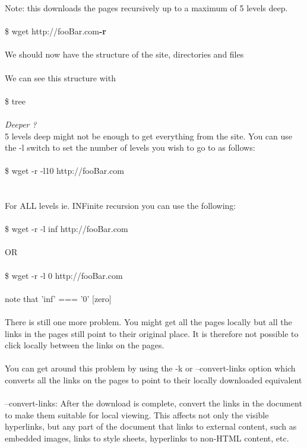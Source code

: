 \documentclass[10pt,a4paper]{article}
\begin{document}
{Note: this downloads the pages recursively up to a maximum of 5 levels deep.\\
\\
\$ wget http://fooBar.com}{\large \textbf{-r}}{\large \\
\\
We should now have the structure of the site, directories and files\\
\\
	We can see this structure with\\
\\
	\$ tree\\
\\
\textit{Deeper ?}}{\large \\
5 levels deep might not be enough to get everything from the site. You can use the -l switch to set the number of levels you wish to go to as follows:\\
\\
\$ wget -r -l10 http://fooBar.com}{\large \\
\\
\\
For ALL levels ie. INFinite recursion you can use the following:\\
\\
\$ wget -r -l inf http://fooBar.com}{\large \\
\\
OR\\
\\
\$ wget -r -l 0 http://fooBar.com}{\large \\
\\
note that 'inf' === '0' [zero] \\
\\
There is still one more problem. You might get all the pages locally but all the links in the pages still point to their original place. It is therefore not possible to click locally between the links on the pages.\\
\\
You can get around this problem by using the -k or --convert-links option which converts all the links on the pages to point to their locally downloaded equivalent\\
\\
--convert-links: After the download is complete, convert the links in the document to make them suitable for local viewing.  This affects not only the visible hyperlinks, but any part of the document that links to external content, such as embedded images, links to style sheets, hyperlinks to non-HTML content, etc.\\
}
\end{document}
